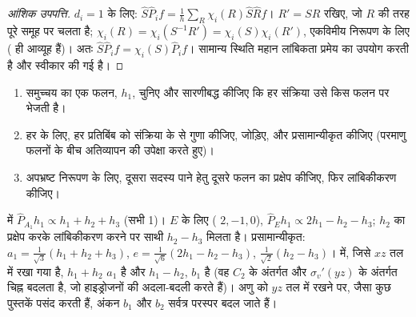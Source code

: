 \begin{proof}[आंशिक उपपत्ति]
$d_i = 1$ के लिए: $\hat S\hat P_if = \frac1h\sum_R\chi_i(R)\hat S\hat Rf$। $R' = SR$ रखिए,
जो $R$ की तरह पूरे समूह पर चलता है; $\chi_i(R) = \chi_i(S^{-1}R') =
\chi_i(S)\chi_i(R')$, एकविमीय निरूपण के लिए ( ही
आव्यूह हैं)। अतः $\hat S\hat P_if = \chi_i(S)\hat P_if$। सामान्य
स्थिति महान लांबिकता प्रमेय का उपयोग करती है और स्वीकार की गई है।
\end{proof}

\begin{method}[सममिति-अनुकूलित संयोजन बनाना]\label{met:b3:group-theory-applied:salc}
\begin{enumerate}
  \item समुच्चय का एक फलन, $h_1$, चुनिए और सारणीबद्ध कीजिए कि हर
        संक्रिया उसे किस फलन पर भेजती है।
  \item हर  के लिए, हर प्रतिबिंब को संक्रिया के
         से गुणा कीजिए, जोड़िए, और प्रसामान्यीकृत कीजिए (परमाणु फलनों के बीच
        अतिव्यापन की उपेक्षा करते हुए)।
  \item अपभ्रष्ट निरूपण के लिए, दूसरा सदस्य पाने हेतु दूसरे फलन का प्रक्षेप
        कीजिए, फिर लांबिकीकरण कीजिए।
\end{enumerate}
\end{method}

\begin{example}[अमोनिया और जल के संयोजन]\label{ex:b3:group-theory-applied:salcs}
 में $\hat P_{A_1}h_1 \propto h_1 + h_2 + h_3$ (सभी  1)। $E$ के लिए
( $2, -1, 0$), $\hat P_Eh_1 \propto 2h_1 - h_2 - h_3$; $h_2$ का प्रक्षेप करके
लांबिकीकरण करने पर साथी $h_2 - h_3$ मिलता है। प्रसामान्यीकृत: $a_1 =
\frac{1}{\sqrt3}(h_1 + h_2 + h_3)$, $e = \frac{1}{\sqrt6}(2h_1 - h_2 - h_3)$,
$\frac{1}{\sqrt2}(h_2 - h_3)$।  में, जिसे $xz$ तल में रखा गया है, $h_1 + h_2$
$a_1$ है और $h_1 - h_2$, $b_1$ है (वह $C_2$ के अंतर्गत और $\sigma_v'(yz)$ के अंतर्गत चिह्न बदलता है,
जो हाइड्रोजनों की अदला-बदली करते हैं)। अणु को $yz$ तल में रखने पर, जैसा कुछ
पुस्तकें पसंद करती हैं, अंकन $b_1$ और $b_2$ सर्वत्र परस्पर बदल जाते हैं।
\end{example}

